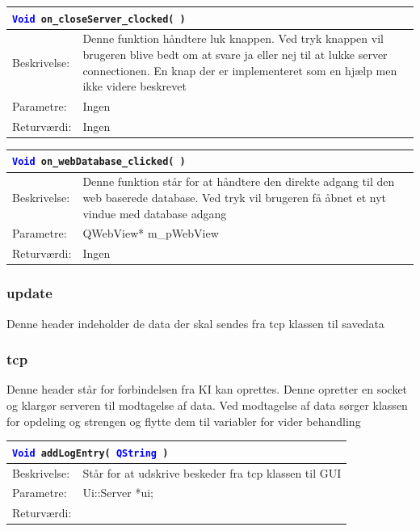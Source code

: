 \begin{table}[H]
\begin{tabular}{l p{12.5cm}}
\multicolumn{2}{l}{\texttt{\textcolor{blue}{Void} on\_closeServer\_clocked( )}} \\
\hline
Beskrivelse: &Denne funktion håndtere luk knappen. Ved tryk knappen vil brugeren blive bedt om at svare ja eller nej til at lukke server connectionen. En knap der er implementeret som en hjælp men ikke videre beskrevet \\
Parametre: & Ingen\\
Returværdi: & Ingen\\
\end{tabular}
\end{table}

\begin{table}[H]
\begin{tabular}{l p{12.5cm}}
\multicolumn{2}{l}{\texttt{\textcolor{blue}{Void} on\_webDatabase\_clicked( )}} \\
\hline
Beskrivelse: & Denne funktion står for at håndtere den direkte adgang til den web baserede database. Ved tryk vil brugeren få åbnet et nyt vindue med database adgang \\
Parametre: & QWebView* m\_pWebView\\
Returværdi: & Ingen\\
\end{tabular}
\end{table}

\subsubsection{update}
Denne header indeholder de data der skal sendes fra tcp klassen til savedata

\subsubsection{tcp}
Denne header står for forbindelsen fra KI kan oprettes. Denne opretter en socket og klargør serveren til modtagelse af data. Ved modtagelse af data sørger klassen for opdeling og strengen og flytte dem til variabler for vider behandling

\begin{table}[H]
\begin{tabular}{l p{12.5cm}}
\multicolumn{2}{l}{\texttt{\textcolor{blue}{Void} addLogEntry( \textcolor{blue}{QString} )}} \\
\hline
Beskrivelse: & Står for at udskrive beskeder fra tcp klassen til GUI \\
Parametre: & Ui::Server *ui;\\
Returværdi:&\\
\end{tabular}
\end{table}

